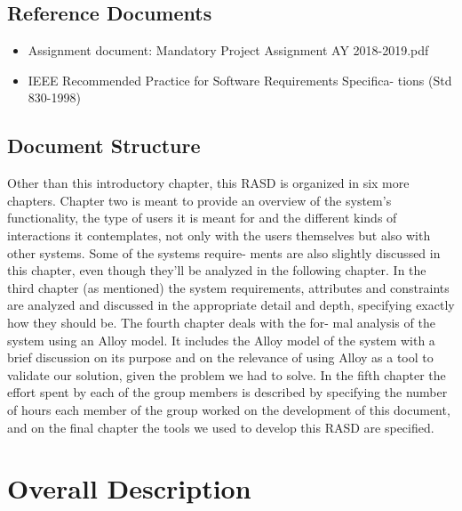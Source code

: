 \documentclass[12pt]{article}
\begin{document}
\subsection{Reference Documents}
\begin{itemize}
\item Assignment document: Mandatory Project Assignment AY 2018-2019.pdf
\item IEEE Recommended Practice for Software Requirements Specifica- tions (Std 830-1998)
\end{itemize}
\subsection{Document Structure}
Other than this introductory chapter, this RASD is organized in six more chapters. Chapter two is meant to provide an overview of the system’s functionality, the type of users it is meant for and the different kinds of interactions it contemplates, not only with the users themselves but also with other systems. Some of the systems require- ments are also slightly discussed in this chapter, even though they’ll be analyzed in the following chapter. In the third chapter (as mentioned) the system requirements, attributes and constraints are analyzed and discussed in the appropriate detail and depth, specifying exactly how they should be. The fourth chapter deals with the for- mal analysis of the system using an Alloy model. It includes the Alloy model of the system with a brief discussion on its purpose and on the relevance of using Alloy as a tool to validate our solution, given the problem we had to solve. In the fifth chapter the effort spent by each of the group members is described by specifying the number of hours each member of the group worked on the development of this document, and on the final chapter the tools we used to develop this RASD are specified.

\section{Overall Description}
\end{document}
